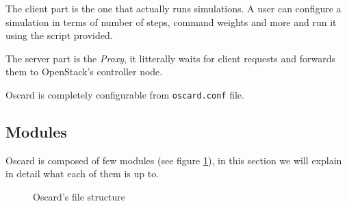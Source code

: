 The client part is the one that actually runs simulations. A user can configure a simulation in terms of number of steps, command weights and more and run it using the script provided.

The server part is the \textit{Proxy}, it litterally waits for client requests and forwards them to OpenStack's controller node.

Oscard is completely configurable from \texttt{oscard.conf} file.

\subsection{Modules}
\label{sub:oscard_modules}
Oscard is composed of few modules (see figure \ref{fig:oscard_tree}), in this section we will explain in detail what each of them is up to.

\begin{figure}[!ht]
\label{fig:oscard_tree}
\caption{Oscard's file structure}
\end{figure}

